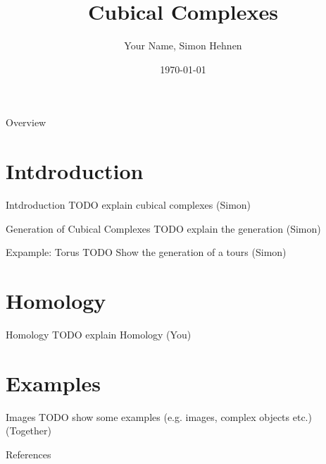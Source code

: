 \documentclass[aspectratio=169,xcolor=dvipsnames]{beamer}
\title{Cubical Complexes}
\subtitle{}
\author{Your Name, Simon Hehnen}
\institute
{
    Faculty of Computer and Information Science \\
    University of Ljubljana %
}
\date{\today} %
\begin{document}
\begin{frame}
    \titlepage
\end{frame}

\begin{frame}{Overview}
    \tableofcontents
\end{frame}

\section{Intdroduction}

\begin{frame}{Intdroduction}
    TODO explain cubical complexes (Simon)
\end{frame}


\begin{frame}{Generation of Cubical Complexes}
    TODO explain the generation (Simon)
\end{frame}


\begin{frame}{Expample: Torus}
    TODO Show the generation of a tours (Simon)
\end{frame}

\section{Homology}

\begin{frame}{Homology}
    TODO explain Homology (You)
\end{frame}

\section{Examples}

\begin{frame}{Images}
    TODO show some examples (e.g. images, complex objects etc.) (Together)
\end{frame}

\begin{frame}{References}
    \footnotesize
    
    
\end{frame}
\end{document}
